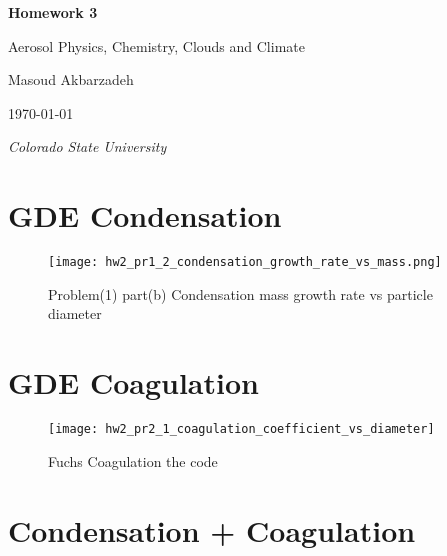 \documentclass[12pt]{article}
\begin{document}
\begin{titlepage}
\centering
{\LARGE\bfseries Homework 3}

\vspace{1cm}

{\Large Aerosol Physics, Chemistry, Clouds and Climate}

\vspace{2cm}

{\large Masoud Akbarzadeh}

\vspace{2cm}

{ \today }

\vfill

{\itshape Colorado State University}
\end{titlepage}



\section{GDE Condensation}\label{sec:problem-1}



\begin{figure}\label{fig:problem-1-b-2}
    \begin{center}
        \texttt{[image: hw2\_pr1\_2\_condensation\_growth\_rate\_vs\_mass.png]}
        \caption{Problem(1) part(b) Condensation mass growth rate vs particle diameter}
    \end{center}
\end{figure}




\newpage
\section{GDE Coagulation}\label{sec:problem-2}
\begin{figure}\label{fig:problem-2-a-1}
\begin{center}
\texttt{[image: hw2\_pr2\_1\_coagulation\_coefficient\_vs\_diameter]}
\caption{Fuchs Coagulation the code}
\end{center}
\end{figure}

\newpage
\section{Condensation + Coagulation}\label{sec:problem-2}
\end{document}
